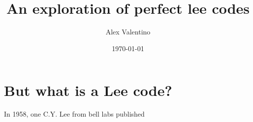 \documentclass[12pt, letterpaper]{article}
\date{\today}
\author{Alex Valentino}
\title{An exploration of perfect lee codes}
\begin{document}
\maketitle
\section{But what is a Lee code?}
In 1958, one C.Y. Lee from bell labs published \cite{jauslin2018high}


\end{document}
